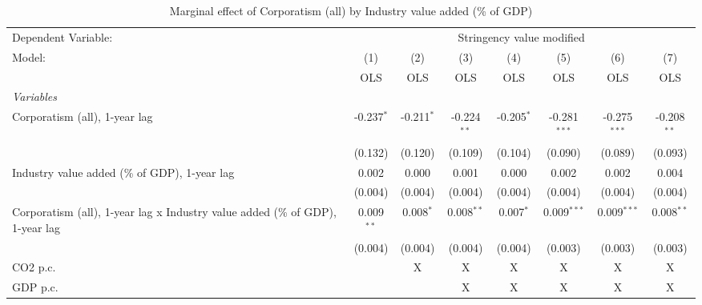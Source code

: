
\begin{table}[htbp]
   \caption{Marginal effect of Corporatism (all) by Industry value added (\% of GDP)}
   \centering
   \begin{tabular}{lccccccc}
      \toprule
      Dependent Variable: & \multicolumn{7}{c}{Stringency value modified}\\
      Model:                                                                        & (1)          & (2)          & (3)           & (4)          & (5)            & (6)            & (7)\\  
                                                                                    &  OLS         & OLS          & OLS           & OLS          & OLS            & OLS            & OLS\\  
      \midrule
      \emph{Variables}\\
      Corporatism (all), 1-year lag                                                 & -0.237$^{*}$ & -0.211$^{*}$ & -0.224$^{**}$ & -0.205$^{*}$ & -0.281$^{***}$ & -0.275$^{***}$ & -0.208$^{**}$\\   
                                                                                    & (0.132)      & (0.120)      & (0.109)       & (0.104)      & (0.090)        & (0.089)        & (0.093)\\   
      Industry value added (\% of GDP), 1-year lag                                  & 0.002        & 0.000        & 0.001         & 0.000        & 0.002          & 0.002          & 0.004\\   
                                                                                    & (0.004)      & (0.004)      & (0.004)       & (0.004)      & (0.004)        & (0.004)        & (0.004)\\   
      Corporatism (all), 1-year lag x Industry value added (\% of GDP), 1-year lag  & 0.009$^{**}$ & 0.008$^{*}$  & 0.008$^{**}$  & 0.007$^{*}$  & 0.009$^{***}$  & 0.009$^{***}$  & 0.008$^{**}$\\   
                                                                                    & (0.004)      & (0.004)      & (0.004)       & (0.004)      & (0.003)        & (0.003)        & (0.003)\\   
      CO2 p.c.                                                                      &              & X            & X             & X            & X              & X              & X\\  
      GDP p.c.                                                                      &              &              & X             & X            & X              & X              & X\\  

\end{tabular}
\end{table}
